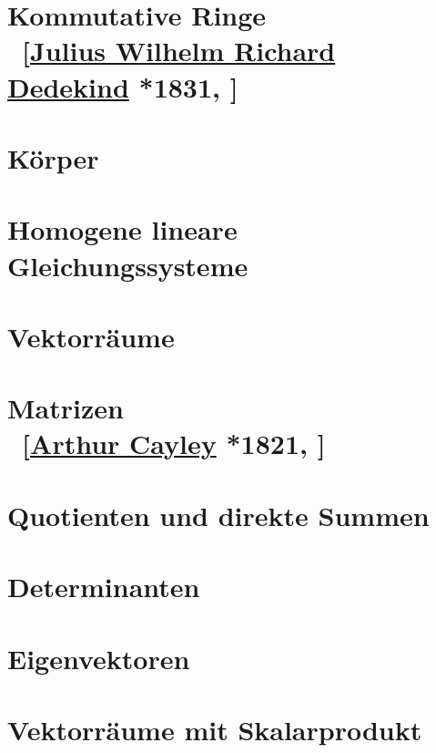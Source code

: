 \documentclass[
twoside=semi, %
fontsize=12,
DIV=12, %
cleardoublepage=current,
leqno,
headings=optiontoheadandtoc, %
toc=idx %
]{scrbook}
\theoremstyle{definition}
\begin{document}
\chapter[tocentry={Kommutative Ringe}]{Kommutative Ringe\\ ~{\small[\href{http://de.wikipedia.org/wiki/Richard_Dedekind}{Julius Wilhelm Richard Dedekind} *1831, ]}}
    

\chapter{Körper}
    
    
\chapter{Homogene lineare Gleichungssysteme}\label{5}
    
    
\chapter{Vektorräume}
    \subject{b1/b1Kapitel/b1Vektorraume}
    
\chapter[tocentry={Matrizen}]{Matrizen \\ ~\small{[\href{http://de.wikipedia.org/wiki/Arthur_Cayley}{Arthur Cayley} *1821, ]}}
    

\chapter{Quotienten und direkte Summen}
    
    
\chapter{Determinanten}
    
    
\chapter{Eigenvektoren}
    
    
\chapter{Vektorräume mit Skalarprodukt}
    
\end{document}
